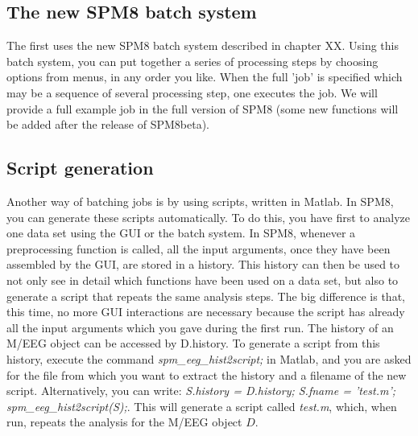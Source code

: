 \subsection{The new SPM8 batch system}
The first uses the new SPM8 batch system described in chapter XX. Using this batch system, you can put together a series of processing steps by choosing options from menus, in any order you like. When the full 'job' is specified which may be a sequence of several processing step, one executes the job. We will provide a full example job in the full version of SPM8 (some new functions will be added after the release of SPM8beta). 


\subsection{Script generation}
Another way of batching jobs is by using scripts, written in Matlab. In SPM8, you can generate these scripts automatically. To do this, you have first to analyze one data set using the GUI or the batch system. In SPM8, whenever a preprocessing function is called, all the input arguments, once they have been assembled by the GUI, are stored in a history. This history can then be used to not only see in detail which functions have been used on a data set, but also to generate a script that repeats the same analysis steps. The big difference is that, this time, no more GUI interactions are necessary because the script has already all the input arguments which you gave during the first run. The history of an M/EEG object can be accessed by D.history. To generate a script from this history, execute the command \textit{spm\_eeg\_hist2script;} in Matlab, and you are asked for the file from which you want to extract the history and a filename of the new script. Alternatively, you can write: \textit{S.history = D.history; S.fname = 'test.m'; spm\_eeg\_hist2script(S);}. This will generate a script called \textit{test.m}, which, when run, repeats the analysis for the M/EEG object $D$. 
\\
\\
